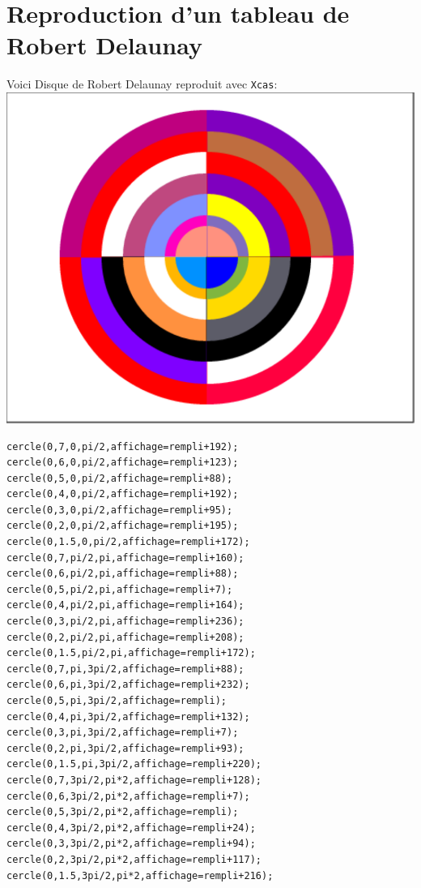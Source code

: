 \documentclass[a4paper,11pt]{book}
\begin{document}
\section{Reproduction d'un tableau de Robert Delaunay}
Voici Disque de Robert Delaunay reproduit avec {\tt Xcas}:\\
\includegraphics[width=\textwidth]{delaunay}
\begin{verbatim}
cercle(0,7,0,pi/2,affichage=rempli+192);
cercle(0,6,0,pi/2,affichage=rempli+123);
cercle(0,5,0,pi/2,affichage=rempli+88);
cercle(0,4,0,pi/2,affichage=rempli+192);
cercle(0,3,0,pi/2,affichage=rempli+95);
cercle(0,2,0,pi/2,affichage=rempli+195);
cercle(0,1.5,0,pi/2,affichage=rempli+172);
cercle(0,7,pi/2,pi,affichage=rempli+160);
cercle(0,6,pi/2,pi,affichage=rempli+88);
cercle(0,5,pi/2,pi,affichage=rempli+7);
cercle(0,4,pi/2,pi,affichage=rempli+164);
cercle(0,3,pi/2,pi,affichage=rempli+236);
cercle(0,2,pi/2,pi,affichage=rempli+208);
cercle(0,1.5,pi/2,pi,affichage=rempli+172);
cercle(0,7,pi,3pi/2,affichage=rempli+88);
cercle(0,6,pi,3pi/2,affichage=rempli+232);
cercle(0,5,pi,3pi/2,affichage=rempli);
cercle(0,4,pi,3pi/2,affichage=rempli+132);
cercle(0,3,pi,3pi/2,affichage=rempli+7);
cercle(0,2,pi,3pi/2,affichage=rempli+93);
cercle(0,1.5,pi,3pi/2,affichage=rempli+220);
cercle(0,7,3pi/2,pi*2,affichage=rempli+128);
cercle(0,6,3pi/2,pi*2,affichage=rempli+7);
cercle(0,5,3pi/2,pi*2,affichage=rempli);
cercle(0,4,3pi/2,pi*2,affichage=rempli+24);
cercle(0,3,3pi/2,pi*2,affichage=rempli+94);
cercle(0,2,3pi/2,pi*2,affichage=rempli+117);
cercle(0,1.5,3pi/2,pi*2,affichage=rempli+216);
\end{verbatim}
\end{document}

